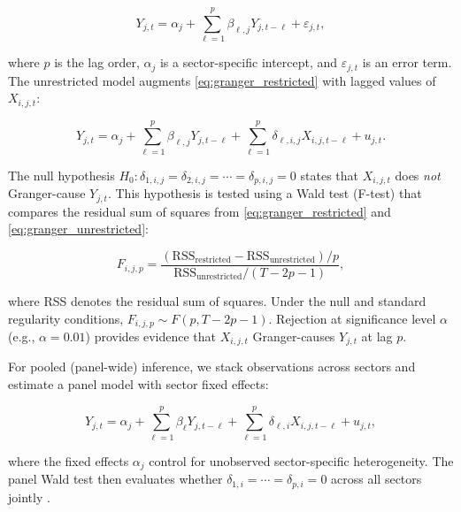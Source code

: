 \documentclass[preprint, 3p,
authoryear]{elsarticle} %
\begin{document}
\begin{equation}
Y_{j,t} = \alpha_{j} + \sum_{\ell=1}^{p} \beta_{\ell,j} Y_{j,t-\ell} + \varepsilon_{j,t},
\label{eq:granger_restricted}
\end{equation}

\noindent where \(p\) is the lag order, \(\alpha_{j}\) is a
sector-specific intercept, and \(\varepsilon_{j,t}\) is an error term.
The unrestricted model augments \eqref{eq:granger_restricted} with
lagged values of \(X_{i,j,t}\):

\begin{equation}
Y_{j,t} = \alpha_{j} + \sum_{\ell=1}^{p} \beta_{\ell,j} Y_{j,t-\ell} + \sum_{\ell=1}^{p} \delta_{\ell,i,j} X_{i,j,t-\ell} + u_{j,t}.
\label{eq:granger_unrestricted}
\end{equation}

\noindent The null hypothesis
\(H_0\colon \delta_{1,i,j} = \delta_{2,i,j} = \cdots = \delta_{p,i,j} = 0\)
states that \(X_{i,j,t}\) does \textit{not} Granger-cause \(Y_{j,t}\).
This hypothesis is tested using a Wald test (F-test) that compares the
residual sum of squares from \eqref{eq:granger_restricted} and
\eqref{eq:granger_unrestricted}:

\begin{equation}
F_{i,j,p} = \frac{(\text{RSS}_{\text{restricted}} - \text{RSS}_{\text{unrestricted}})/p}{\text{RSS}_{\text{unrestricted}}/(T - 2p - 1)},
\label{eq:granger_ftest}
\end{equation}

\noindent where RSS denotes the residual sum of squares. Under the null
and standard regularity conditions, \(F_{i,j,p} \sim F(p, T - 2p - 1)\).
Rejection at significance level \(\alpha\) (e.g., \(\alpha = 0.01\))
provides evidence that \(X_{i,j,t}\) Granger-causes \(Y_{j,t}\) at lag
\(p\).

For pooled (panel-wide) inference, we stack observations across sectors
and estimate a panel model with sector fixed effects:

\begin{equation}
Y_{j,t} = \alpha_{j} + \sum_{\ell=1}^{p} \beta_{\ell} Y_{j,t-\ell} + \sum_{\ell=1}^{p} \delta_{\ell,i} X_{i,j,t-\ell} + u_{j,t},
\label{eq:granger_panel}
\end{equation}

\noindent where the fixed effects \(\alpha_{j}\) control for unobserved
sector-specific heterogeneity. The panel Wald test then evaluates
whether \(\delta_{1,i} = \cdots = \delta_{p,i} = 0\) across all sectors
jointly \citep{dumitrescu2012}.
\end{document}
